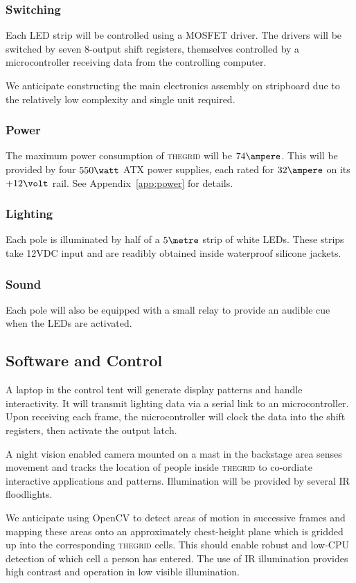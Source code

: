 \documentclass[12pt]{article} %
\newcommand{\thegrid}{\textsc{the\textperiodcentered grid}\xspace}
\begin{document}
\subsubsection{Switching}
Each LED strip will be controlled using a MOSFET driver.  The drivers will be
switched by seven 8-output shift registers, themselves controlled by a
microcontroller receiving data from the controlling computer.

We anticipate constructing the main electronics assembly on stripboard due to
the relatively low complexity and single unit required.


\subsubsection{Power}
The maximum power consumption of \thegrid will be $74\ampere$.  This will be
provided by four $550\watt$ ATX power supplies, each rated for $32\ampere$ on
its $+12\volt$ rail.  See Appendix~\ref{app:power} for details.

\subsubsection{Lighting}
Each pole is illuminated by half of a $5\metre$ strip of white LEDs. These
strips take 12VDC input and are readibly obtained inside waterproof silicone
jackets.

\subsubsection{Sound}
Each pole will also be equipped with a small relay to provide an audible cue
when the LEDs are activated.

\subsection{Software and Control}
A laptop in the control tent will generate display patterns and handle
interactivity.  It will transmit lighting data via a serial link to an
microcontroller.  Upon receiving each frame, the microcontroller will clock the
data into the shift registers, then activate the output latch.

A night vision enabled camera mounted on a mast in the backstage area senses
movement and tracks the location of people inside \thegrid to co-ordiate
interactive applications and patterns.  Illumination will be provided by
several IR floodlights.

We anticipate using OpenCV to detect areas of motion in successive frames and
mapping these areas onto an approximately chest-height plane which is gridded
up into the corresponding \thegrid cells.  This should enable robust and
low-CPU detection of which cell a person has entered.  The use of IR
illumination provides high contrast and operation in low visible illumination.
\end{document}

